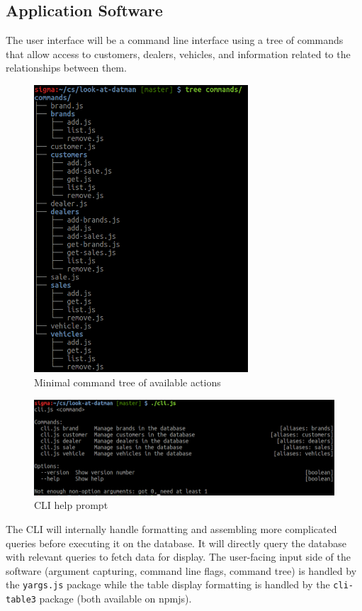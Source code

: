 \documentclass{math}
\begin{document}
\subsection*{Application Software}
The user interface will be a command line interface using a tree of commands
that allow access to customers, dealers, vehicles, and information related to
the relationships between them.
\begin{figure}[H]
  \centering
  \includegraphics[width=8cm]{assets/phase2_command_tree.png}
  \caption{Minimal command tree of available actions}
\end{figure}
\begin{figure}[H]
  \centering
  \includegraphics[width=18cm]{assets/phase2_manpage.png}
  \caption{CLI help prompt}
\end{figure}
The CLI will internally handle formatting and assembling more complicated
queries before executing it on the database. It will directly query the database
with relevant queries to fetch data for display. The user-facing input side of
the software (argument capturing, command line flags, command tree) is handled
by the \texttt{yargs.js} package while the table display formatting is handled
by the \texttt{cli-table3} package (both available on npmjs).
\end{document}
